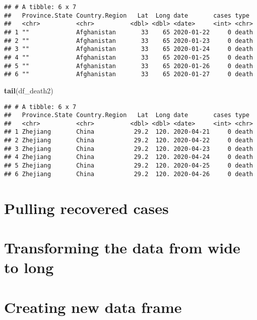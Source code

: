 \documentclass[
]{article}
\newenvironment{Shaded}{\begin{snugshade}}{\end{snugshade}}
\newcommand{\KeywordTok}[1]{\textcolor[rgb]{0.13,0.29,0.53}{\textbf{#1}}}
\newcommand{\NormalTok}[1]{#1}
\begin{document}
\begin{verbatim}
## # A tibble: 6 x 7
##   Province.State Country.Region   Lat  Long date       cases type 
##   <chr>          <chr>          <dbl> <dbl> <date>     <int> <chr>
## 1 ""             Afghanistan       33    65 2020-01-22     0 death
## 2 ""             Afghanistan       33    65 2020-01-23     0 death
## 3 ""             Afghanistan       33    65 2020-01-24     0 death
## 4 ""             Afghanistan       33    65 2020-01-25     0 death
## 5 ""             Afghanistan       33    65 2020-01-26     0 death
## 6 ""             Afghanistan       33    65 2020-01-27     0 death
\end{verbatim}

\begin{Shaded}
\begin{Highlighting}[]
\KeywordTok{tail}\NormalTok{(df_death2)}
\end{Highlighting}
\end{Shaded}

\begin{verbatim}
## # A tibble: 6 x 7
##   Province.State Country.Region   Lat  Long date       cases type 
##   <chr>          <chr>          <dbl> <dbl> <date>     <int> <chr>
## 1 Zhejiang       China           29.2  120. 2020-04-21     0 death
## 2 Zhejiang       China           29.2  120. 2020-04-22     0 death
## 3 Zhejiang       China           29.2  120. 2020-04-23     0 death
## 4 Zhejiang       China           29.2  120. 2020-04-24     0 death
## 5 Zhejiang       China           29.2  120. 2020-04-25     0 death
## 6 Zhejiang       China           29.2  120. 2020-04-26     0 death
\end{verbatim}

\hypertarget{pulling-recovered-cases}{%
\section{Pulling recovered cases}\label{pulling-recovered-cases}}

\hypertarget{transforming-the-data-from-wide-to-long-2}{%
\section{Transforming the data from wide to
long}\label{transforming-the-data-from-wide-to-long-2}}

\hypertarget{creating-new-data-frame-2}{%
\section{Creating new data frame}\label{creating-new-data-frame-2}}
\end{document}
